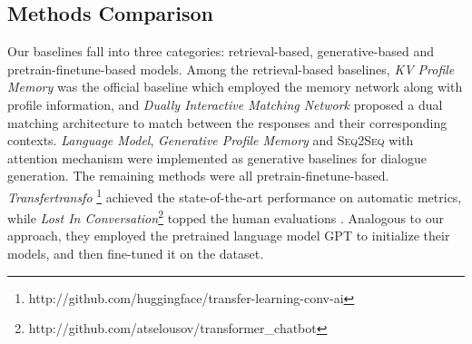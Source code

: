 \documentclass[11pt,a4paper]{article}
\begin{document}
\subsection{Methods Comparison}\label{sec:model_compare}

Our baselines fall into three categories: retrieval-based, generative-based and pretrain-finetune-based models. Among the retrieval-based baselines, \textit{KV Profile Memory} \cite{zhang2018personalizing} was the official baseline which employed the memory network along with profile information, and \textit{Dually Interactive Matching Network} \cite{gu2019dually} proposed a dual matching architecture to match between the responses and their corresponding contexts. \textit{Language Model}, \textit{Generative Profile Memory} \cite{zhang2018personalizing} and \textsc{Seq2Seq} with attention mechanism \cite{Bahdanau2014NeuralMT} were implemented as generative baselines for dialogue generation. The remaining methods were all pretrain-finetune-based. \textit{Transfertransfo} \cite{wolf2019transfertransfo}\footnote{http://github.com/huggingface/transfer-learning-conv-ai} achieved the state-of-the-art performance on automatic metrics, while \textit{Lost In Conversation}\footnote{http://github.com/atselousov/transformer\_chatbot} topped the human evaluations \cite{dinan2019second}. Analogous to our approach, they employed the pretrained language model GPT to initialize their models, and then fine-tuned it on the dataset.


\begin{table}[t]
    \centering
    \caption{Human evaluation results.}
    \label{tab:human_evalution}
    \vspace{-2mm}
\end{table}
\end{document}
